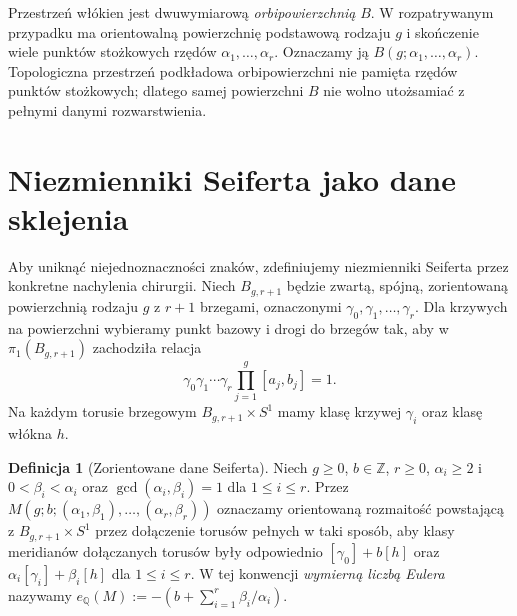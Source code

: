 \documentclass[11pt,a4paper]{report}
\numberwithin{equation}{section}
\theoremstyle{plain}
\theoremstyle{definition}
\newtheorem{definicja}[twierdzenie]{Definicja}
\theoremstyle{remark}
\begin{document}
Przestrzeń włókien jest dwuwymiarową \emph{orbipowierzchnią}
$B$. W rozpatrywanym przypadku ma orientowalną powierzchnię
podstawową rodzaju $g$ i skończenie wiele punktów stożkowych
rzędów $\alpha_1,\ldots,\alpha_r$. Oznaczamy ją
$B(g;\alpha_1,\ldots,\alpha_r)$. Topologiczna
przestrzeń podkładowa orbipowierzchni nie pamięta rzędów
punktów stożkowych; dlatego samej powierzchni $B$ nie wolno
utożsamiać z pełnymi danymi rozwarstwienia.

\begin{center}
\end{center}

\section{Niezmienniki Seiferta jako dane sklejenia}
\label{sec:tg-seifert-gluing}

Aby uniknąć niejednoznaczności znaków, zdefiniujemy
niezmienniki Seiferta przez konkretne nachylenia chirurgii.
Niech $B_{g,r+1}$ będzie zwartą, spójną, zorientowaną
powierzchnią rodzaju $g$ z $r+1$ brzegami, oznaczonymi
$\gamma_0,\gamma_1,\ldots,\gamma_r$.
Dla krzywych na powierzchni wybieramy punkt bazowy i drogi
do brzegów tak, aby w $\pi_1(B_{g,r+1})$ zachodziła relacja
\[
\gamma_0\gamma_1\cdots\gamma_r
\prod_{j=1}^g[a_j,b_j]=1.
\]
Na każdym torusie brzegowym $B_{g,r+1}\times S^1$ mamy
klasę krzywej $\gamma_i$ oraz klasę włókna $h$.

\begin{definicja}[Zorientowane dane Seiferta]
Niech $g\geq0$, $b\in\mathbb Z$, $r\geq0$,
$\alpha_i\geq2$ i $0<\beta_i<\alpha_i$ oraz
$\gcd(\alpha_i,\beta_i)=1$ dla $1\leq i\leq r$.
Przez
$M(g;b;(\alpha_1,\beta_1),\ldots,(\alpha_r,\beta_r))$
oznaczamy orientowaną rozmaitość powstającą z
$B_{g,r+1}\times S^1$ przez dołączenie torusów pełnych
w taki sposób, aby klasy meridianów dołączanych torusów
były odpowiednio
$[\gamma_0]+b[h]$ oraz
$\alpha_i[\gamma_i]+\beta_i[h]$ dla $1\leq i\leq r$.
W tej konwencji \emph{wymierną liczbą Eulera} nazywamy
$e_{\mathbb Q}(M):=-(b+\sum_{i=1}^r\beta_i/\alpha_i)$.
\end{definicja}
\end{document}
